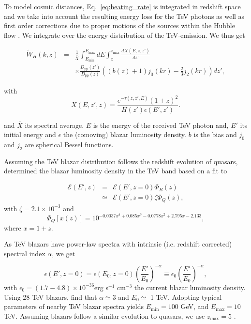 \documentclass[twocolumns]{emulateapj}
\begin{document}
 To model cosmic distances, Eq.~\eqref{eq:heating_rate} is integrated in redshift space and we take into account the resulting energy loss for the TeV photons as well as first order corrections due to proper motions of the sources within the Hubble flow \citep{1987MNRAS.227....1K}. We integrate over the energy distribution of the TeV-emission. We thus get

\begin{eqnarray}
  \label{eq:window}
  \tilde{W}_H(k,z)&=&\frac{1}{\bar{X}}\int_{E_{\mathrm{min}}}^{E_{\mathrm{max}}}dE\int_z^{z_{\mathrm{max}}}\frac{dX(E,z,z')}{dz'} \\ 
&&\times \frac{D_{\mathrm{pp}}(z')}{D_{\mathrm{pp}}(z)}\left((b(z)+1)j_0(kr)-\frac{2}{3}j_2(kr)\right)dz', \nonumber
\end{eqnarray}

with 
 \begin{equation}
  \label{eq:define_X}
  X(E,z',z)=\frac{e^{-\tau(z,z',E)}(1+z)^2}{H(z')\epsilon(E',z')}.
\end{equation}

and $\bar{X}$ its spectral average. $E$ is the energy of the received TeV photon and, $E'$ its initial energy and  $\epsilon$ the (comoving) blazar luminosity density. $b$ is the bias and $j_0$ and $j_2$ are spherical Bessel functions.


Assuming the TeV blazar distribution follows the redshift evolution of quasars, \citet{2012ApJ...752...22B} determined the blazar luminosity density in the TeV band based on a fit to \citet{2007ApJ...654..731H}

\begin{eqnarray}
  \label{eq:mean_heat}
  \mathcal{E}(E',z)&=&\mathcal{E}(E',z=0)\Phi_{B}(z)\\ \nonumber
&\simeq& \mathcal{E}(E',z=0)\zeta\Phi_{Q}(z),
\end{eqnarray}
with $\zeta=2.1\times 10^{-3}$ and
\begin{equation}
  \label{eq:phi_quasar}
 \Phi_{Q}[x(z)]=10^{-0.0037x^4+0.085x^3-0.0778x^2+2.795x-2.133},
\end{equation}
 where $x=1+z$.

As TeV blazars have power-law spectra with intrinsic (i.e. redshift corrected) spectral index $\alpha$, we get

\begin{equation}
  \label{eq:blaz_lum}
  \epsilon(E',z=0)=\epsilon(E_0,z=0)\left(\frac{E'}{E_0}\right)^{-\alpha}\equiv \epsilon_0\left(\frac{E'}{E_0}\right)^{-\alpha},
\end{equation}
with $\epsilon_0=(1.7-4.8)\times 10^{-36}$erg s$^{-1}$ cm$^{-3}$ the current blazar luminosity density. Using 28 TeV blazars, \citet{2012ApJ...752...23C} find that $\alpha\simeq 3$ and $E_0\simeq $ 1 TeV. Adopting typical parameters of nearby  TeV blazar spectra yields $E_{\mathrm{min}}=100$ GeV,  and $E_{\mathrm{max}}=10$ TeV. Assuming blazars follow a similar evolution to quasars, we use $z_\mathrm{max}=5$  \citep{2007ApJ...654..731H}.
\end{document}
